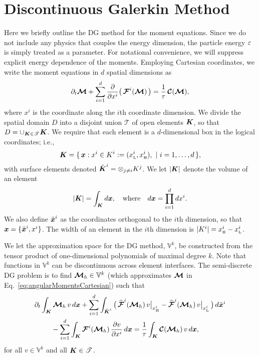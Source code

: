 \section{Discontinuous Galerkin Method}
\label{sec:dg}

Here we briefly outline the DG method for the moment equations.  
Since we do not include any physics that couples the energy dimension, the particle energy $\varepsilon$ is simply treated as a parameter.  
For notational convenience, we will suppress explicit energy dependence of the moments.  
Employing Cartesian coordinates, we write the moment equations in $d$ spatial dimensions as
\begin{equation}
  \partial_{t}{\boldsymbol{\mathcal{M}}}+\sum_{i=1}^{d}\frac{\partial }{\partial x^{i}}\big(\,\boldsymbol{\mathcal{F}}^{i}(\boldsymbol{\mathcal{M}})\,\big)
  =\frac{1}{\tau}\,\boldsymbol{\mathcal{C}}(\boldsymbol{\mathcal{M}}),
  \label{eq:angularMomentsCartesian}
\end{equation}
where $x^{i}$ is the coordinate along the $i$th coordinate dimension.  
We divide the spatial domain $D$ into a disjoint union $\mathscr{T}$ of open elements $\boldsymbol{K}$, so that $D = \cup_{\boldsymbol{K} \in \mathscr{T}}\boldsymbol{K}$.  
We require that each element is a $d$-dimensional box in the logical coordinates; i.e.,
\begin{equation}
  \boldsymbol{K}=\{\,\boldsymbol{x} : x^{i} \in K^{i} := (x_{\mbox{\tiny L}}^{i},x_{\mbox{\tiny H}}^{i}),~|~i=1,\ldots,d\,\}, 
\end{equation}
with surface elements denoted $\tilde{\boldsymbol{K}}^{i}=\otimes_{j\ne i}K^{j}$.  
We let $|\boldsymbol{K}|$ denote the volume of an element
\begin{equation}
  |\boldsymbol{K}| = \int_{\boldsymbol{K}}d\boldsymbol{x}, \quad\text{where}\quad d\boldsymbol{x} = \prod_{i=1}^{d}dx^{i}.  
\end{equation}
We also define $\tilde{\boldsymbol{x}}^{i}$ as the coordinates orthogonal to the $i$th dimension, so that $\boldsymbol{x}=\{\tilde{\boldsymbol{x}}^{i},x^{i}\}$.  
The width of an element in the $i$th dimension is $|K^{i}|=x_{\mbox{\tiny H}}^{i}-x_{\mbox{\tiny L}}^{i}$.  

We let the approximation space for the DG method, $\mathbb{V}^{k}$, be constructed from the tensor product of one-dimensional polynomials of maximal degree $k$.  
Note that functions in $\mathbb{V}^{k}$ can be discontinuous across element interfaces.  
The semi-discrete DG problem is to find $\boldsymbol{\mathcal{M}}_{h}\in\mathbb{V}^{k}$ (which approximates $\boldsymbol{\mathcal{M}}$ in Eq.~\eqref{eq:angularMomentsCartesian}) such that
\begin{align}
  &\partial_{t}{}\int_{\boldsymbol{K}}\boldsymbol{\mathcal{M}}_{h}\,v\,d\boldsymbol{x}
  +\sum_{i=1}^{d}\int_{\tilde{\boldsymbol{K}}^{i}}
  \big(\,
    \widehat{\boldsymbol{\mathcal{F}}}^{i}(\boldsymbol{\mathcal{M}}_{h})\,v\big|_{x_{\mbox{\tiny H}}^{i}}
    -\widehat{\boldsymbol{\mathcal{F}}}^{i}(\boldsymbol{\mathcal{M}}_{h})\,v\big|_{x_{\mbox{\tiny L}}^{i}}
  \,\big)\,d\tilde{\boldsymbol{x}}^{i} \nonumber \\
  &\hspace{24pt}
  -\sum_{i=1}^{d}\int_{\boldsymbol{K}}\boldsymbol{\mathcal{F}}^{i}(\boldsymbol{\mathcal{M}}_{h})\,\frac{\partial v}{\partial x^{i}}\,d\boldsymbol{x}
  =\frac{1}{\tau}\int_{\boldsymbol{K}}\boldsymbol{\mathcal{C}}(\boldsymbol{\mathcal{M}}_{h})\,v\,d\boldsymbol{x},
  \label{eq:semidiscreteDG}
\end{align}
for all $v\in\mathbb{V}^{k}$ and all $\boldsymbol{K}\in\mathscr{T}$.  

